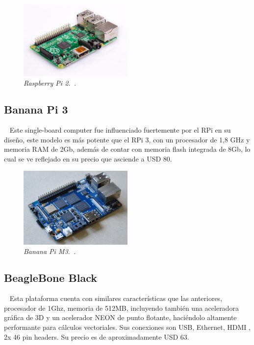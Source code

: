 \begin{figure}[h!]
  \centering
  \includegraphics[width=0.5\textwidth, keepaspectratio]{images/rpi2}
  \caption{\textit{Raspberry Pi 2.~\cite{RPi2}.}}
  \label{fig:rpi2}
\end{figure}

\subsection{Banana Pi 3} ~
Este single-board computer fue influenciado fuertemente por el RPi en su diseño, este modelo es más potente que el RPi 3, con un procesador de 1,8 GHz y memoria RAM de 2Gb, además de contar con memoria flash integrada de 8Gb, lo cual se ve reflejado en su precio que asciende a USD 80. 

\begin{figure}[h!]
  \centering
  \includegraphics[width=0.5\textwidth, keepaspectratio]{images/bpi3}
  \caption{\textit{Banana Pi M3.~\cite{Banana3}.}}
  \label{fig:bpi3}
\end{figure}

\subsection{BeagleBone Black} ~
Esta plataforma cuenta con similares características que las anteriores, procesador de 1Ghz, memoria de 512MB, incluyendo también una aceleradora gráfica de 3D y un acelerador NEON de punto flotante, haciéndolo altamente performante para cálculos vectoriales. Sus conexiones son USB, Ethernet, HDMI , 2x 46 pin headers. Su precio es de aproximadamente USD 63.

